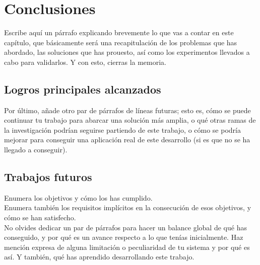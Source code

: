 \chapter{Conclusiones}
\label{cap:capitulo5}


Escribe aquí un párrafo explicando brevemente lo que vas a contar en este capítulo, que básicamente será una recapitulación de los problemas que has abordado, las soluciones que has prouesto, así como los experimentos llevados a cabo para validarlos. Y con esto, cierras la memoria.

\section{Logros principales alcanzados}

Por último, añade otro par de párrafos de líneas futuras; esto es, cómo se puede continuar tu trabajo para abarcar una solución más amplia, o qué otras ramas de la investigación podrían seguirse partiendo de este trabajo, o cómo se podría mejorar para conseguir una aplicación real de este desarrollo (si es que no se ha llegado a conseguir).


\section{Trabajos futuros}

Enumera los objetivos y cómo los has cumplido.\\

Enumera también los requisitos implícitos en la consecución de esos objetivos, y cómo se han satisfecho.\\

No olvides dedicar un par de párrafos para hacer un balance global de qué has conseguido, y por qué es un avance respecto a lo que tenías inicialmente. Haz mención expresa de alguna limitación o peculiaridad de tu sistema y por qué es así. Y también, qué has aprendido desarrollando este trabajo.\\